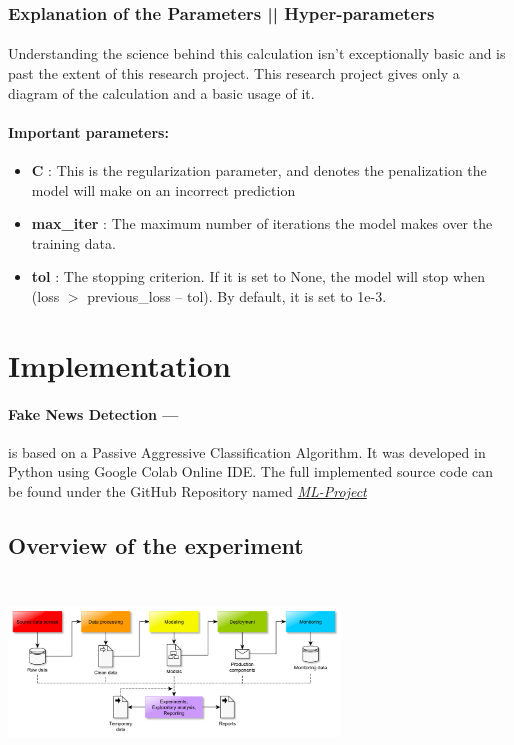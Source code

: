 \documentclass[11.5pt]{article}
\begin{document}
\begin{multicols}{2}
\subsubsection{Explanation of the Parameters || Hyper-parameters}
\paragraph{}
Understanding the science behind this calculation isn't exceptionally basic and is past the extent of this research project. This research project gives only a diagram of the calculation and a basic usage of it.

\paragraph{Important parameters:}
\begin{itemize}
    \item \textbf{C} : This is the regularization parameter, and denotes the penalization the model will make on an incorrect prediction
    \item \textbf{max\_iter} : The maximum number of iterations the model makes over the training data.
    \item \textbf{tol} : The stopping criterion. If it is set to None, the model will stop when (loss $>$ previous\_loss  –  tol). By default, it is set to 1e-3.
\end{itemize}

\section{Implementation}
\paragraph{Fake News Detection ---}
is based on a Passive Aggressive Classification Algorithm. It was developed in Python using Google Colab Online IDE. The full implemented source code can be found under the GitHub Repository named \href{run: https://github.com/IUT-Thesis-Group-Cmr/ML-Project}{\textit{ML-Project}} \cite{projectgroup}

\subsection{Overview of the experiment}
\begin{center}
    \centering
    \includegraphics[width=8.8cm, height=5cm]{Data Science Workflow.png}
    \label{fig:framework}
\end{center}


\end{multicols}
\end{document}
